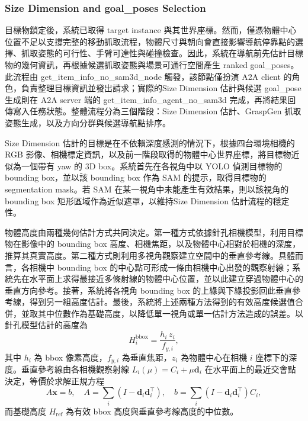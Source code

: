\documentclass[12pt,a4paper]{article}
\makeatletter
\renewcommand\paragraph{\@startsection{paragraph}{4}{\z@}{1.3em}{0.5em}{\normalsize\bfseries}}
\makeatother
\begin{document}
\subsubsection{Size Dimension and goal\_poses Selection}

目標物鎖定後，系統已取得 target instance 與其世界座標。然而，僅憑物體中心位置不足以支撐完整的移動抓取流程，物體尺寸與朝向會直接影響導航停靠點的選擇、抓取姿態的可行性、手臂可達性與碰撞檢查。因此，系統在導航前先估計目標物的幾何資訊，再根據候選抓取姿態與場景可通行空間產生 ranked goal\_poses。此流程由 get\_item\_info\_no\_sam3d\_node 觸發，該節點僅扮演 A2A client 的角色，負責整理目標資訊並發出請求；實際的Size Dimension 估計與候選 goal\_pose 生成則在 A2A server 端的 get\_item\_info\_agent\_no\_sam3d 完成，再將結果回傳寫入任務狀態。整體流程分為三個階段：Size Dimension 估計、GraspGen 抓取姿態生成，以及方向分群與候選導航點排序。

\paragraph{Size Dimension 估計}
Size Dimension 估計的目標是在不依賴深度感測的情況下，根據四台環境相機的 RGB 影像、相機標定資訊，以及前一階段取得的物體中心世界座標，將目標物近似為一個帶有 yaw 的 3D box。系統首先在各視角中以 YOLO 偵測目標物的 bounding box，並以該 bounding box 作為 SAM 的提示，取得目標物的 segmentation mask。若 SAM 在某一視角中未能產生有效結果，則以該視角的 bounding box 矩形區域作為近似遮罩，以維持Size Dimension 估計流程的穩定性。

物體高度由兩種幾何估計方式共同決定。第一種方式依據針孔相機模型，利用目標物在影像中的 bounding box 高度、相機焦距，以及物體中心相對於相機的深度，推算其真實高度。第二種方式則利用多視角觀察建立空間中的垂直參考線。具體而言，各相機中 bounding box 的中心點可形成一條由相機中心出發的觀察射線；系統先在水平面上求得最接近多條射線的物體中心位置，並以此建立穿過物體中心的垂直方向參考。接著，系統將各視角 bounding box 的上緣與下緣投影回此垂直參考線，得到另一組高度估計。最後，系統將上述兩種方法得到的有效高度候選值合併，並取其中位數作為基礎高度，以降低單一視角或單一估計方法造成的誤差。以針孔模型估計的高度為
\begin{equation}
    H^{\mathrm{bbox}}_i=\frac{h_i\,z_i}{f_{y,i}},
\end{equation}
其中 $h_i$ 為 bbox 像素高度，$f_{y,i}$ 為垂直焦距，$z_i$ 為物體中心在相機 $i$ 座標下的深度。垂直參考線由各相機觀察射線 $L_i(\mu)=C_i+\mu\mathbf{d}_i$ 在水平面上的最近交會點決定，等價於求解正規方程
\begin{equation}
    A\mathbf{x}=b,\quad
    A=\sum_i\left(I-\mathbf{d}_i\mathbf{d}_i^\top\right),\quad
    b=\sum_i\left(I-\mathbf{d}_i\mathbf{d}_i^\top\right)C_i,
\end{equation}
而基礎高度 $H_{\mathrm{ref}}$ 為有效 bbox 高度與垂直參考線高度的中位數。
\end{document}
